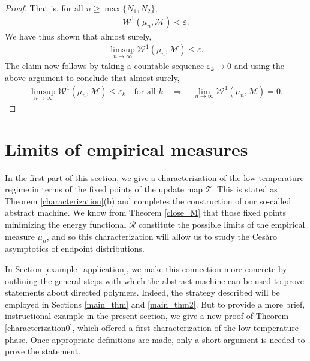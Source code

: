\documentclass[11pt,reqno]{amsart}
\numberwithin{equation}{section}
\theoremstyle{definition}
\begin{document}
\begin{proof}
That is, for all $n \geq \max\{N_1,N_2\}$,
{\begin{align*} {
{\mathcal{W}}^1(\mu_n,{\mathcal{M}}) < {\varepsilon}.
} \end{align*}}
We have thus shown that almost surely,
{\begin{align*} {
\limsup_{n \to \infty} {\mathcal{W}}^1(\mu_n,{\mathcal{M}}) \leq {\varepsilon}.
} \end{align*}}
The claim now follows by taking a countable sequence ${\varepsilon}_k \to 0$ and using the above argument to conclude that almost surely,
{\begin{align*} {
\limsup_{n \to \infty} {\mathcal{W}}^1(\mu_n,{\mathcal{M}}) \leq {\varepsilon}_k \quad \text{for all $k$}
\quad \Rightarrow \quad
\lim_{n \to \infty} {\mathcal{W}}^1(\mu_n,{\mathcal{M}}) = 0.
} \end{align*}}
\end{proof}

\section{Limits of empirical measures} \label{empirical_limits}
In the first part of this section, we give a characterization of the low temperature regime in terms of the fixed points of the update map ${\mathcal{T}}$.
This is stated as Theorem \ref{characterization}(b) and completes the construction of our so-called abstract machine.
We know from Theorem \ref{close_M} that those fixed points minimizing the energy functional ${\mathcal{R}}$ constitute the possible limits of the empirical measure $\mu_n$, and so this characterization will allow us to study the Ces\`aro asymptotics of endpoint distributions.

In Section \ref{example_application}, we make this connection more concrete by outlining the general steps with which the abstract machine can be used to prove statements about directed polymers.
Indeed, the strategy described will be employed in Sections \ref{main_thm} and \ref{main_thm2}.
But to provide a more brief, instructional example in the present section, we give a new proof of Theorem \ref{characterization0},
which offered a first characterization of the low temperature phase.
Once appropriate definitions are made, only a short argument is needed to prove the statement.
\end{document}
